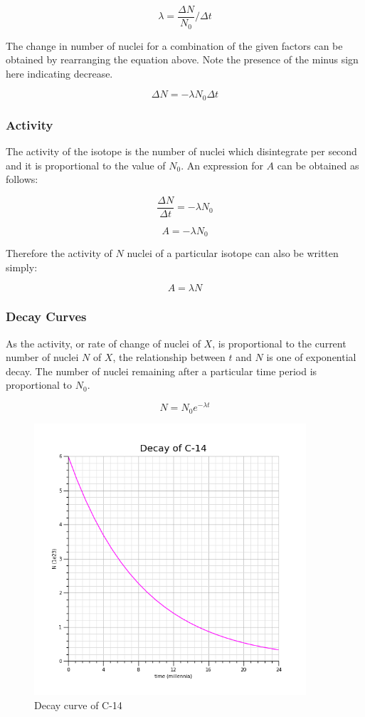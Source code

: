 \documentclass[12pt]{article}
\begin{document}
\[\lambda = \dfrac{\Delta N}{N_0}/\Delta t\]

The change in number of nuclei for a combination of the given factors can be obtained by rearranging the equation above. Note the presence of the minus sign here indicating decrease.

\[ \Delta N = - \lambda N_0 \Delta t\]

\subsubsection{Activity}
\label{sec:org9d2750a}

The activity of the isotope is the number of nuclei which disintegrate per second and it is proportional to the value of \(N_0\). An expression for \(A\) can be obtained as follows:

\[ \dfrac{\Delta N}{\Delta t} = - \lambda N_0\]

\[ A = - \lambda N_0\]

Therefore the activity of \(N\) nuclei of a particular isotope can also be written simply:

\[ A = \lambda N\]

\subsubsection{Decay Curves}
\label{sec:org1af9ffa}

As the activity, or rate of change of nuclei of \(X\), is proportional to the current number of nuclei \(N\) of \(X\), the relationship between \(t\) and \(N\) is one of exponential decay. The number of nuclei remaining after a particular time period is proportional to \(N_0\).

\[N = N_0 e^{- \lambda t}\]

\begin{figure}[H]
\centering
\includegraphics[width=0.9\textwidth,keepaspectratio]{./images/c-14_decay.png}
\caption{Decay curve of C-14}
\end{figure}
\end{document}

